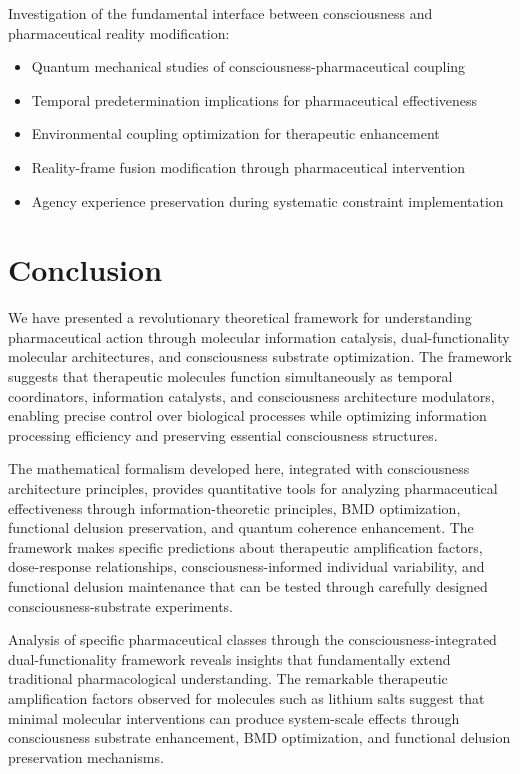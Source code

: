\documentclass[12pt,a4paper]{article}
\begin{document}
Investigation of the fundamental interface between consciousness and pharmaceutical reality modification:

\begin{itemize}
\item Quantum mechanical studies of consciousness-pharmaceutical coupling
\item Temporal predetermination implications for pharmaceutical effectiveness
\item Environmental coupling optimization for therapeutic enhancement
\item Reality-frame fusion modification through pharmaceutical intervention
\item Agency experience preservation during systematic constraint implementation
\end{itemize}

\section{Conclusion}

We have presented a revolutionary theoretical framework for understanding pharmaceutical action through molecular information catalysis, dual-functionality molecular architectures, and consciousness substrate optimization. The framework suggests that therapeutic molecules function simultaneously as temporal coordinators, information catalysts, and consciousness architecture modulators, enabling precise control over biological processes while optimizing information processing efficiency and preserving essential consciousness structures.

The mathematical formalism developed here, integrated with consciousness architecture principles, provides quantitative tools for analyzing pharmaceutical effectiveness through information-theoretic principles, BMD optimization, functional delusion preservation, and quantum coherence enhancement. The framework makes specific predictions about therapeutic amplification factors, dose-response relationships, consciousness-informed individual variability, and functional delusion maintenance that can be tested through carefully designed consciousness-substrate experiments.

Analysis of specific pharmaceutical classes through the consciousness-integrated dual-functionality framework reveals insights that fundamentally extend traditional pharmacological understanding. The remarkable therapeutic amplification factors observed for molecules such as lithium salts suggest that minimal molecular interventions can produce system-scale effects through consciousness substrate enhancement, BMD optimization, and functional delusion preservation mechanisms.
\end{document}
